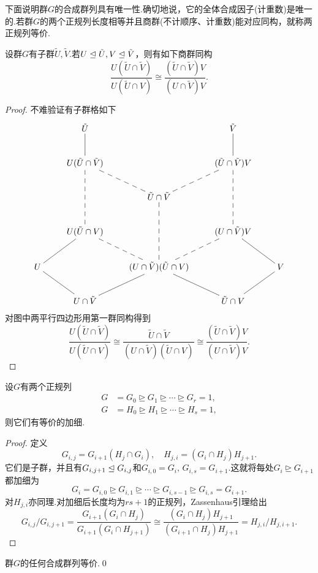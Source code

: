 下面说明群$G$的合成群列具有唯一性.确切地说，它的全体合成因子(计重数)是唯一的.若群$G$的两个正规列长度相等并且商群(不计顺序、计重数)能对应同构，就称两正规列{\heiti 等价}.

\begin{lemma*}[(Zassenhaus)]
	设群$G$有子群$\tilde{U},\tilde{V}$.若$U\trianglelefteq\tilde{U},V\trianglelefteq\tilde{V}$，则有如下商群同构
	\[
		\frac{U(\tilde{U}\cap\tilde{V})}{U(\tilde{U}\cap V)}\cong\frac{(\tilde{U}\cap\tilde{V})V}{(U\cap\tilde{V})V}.
	\]
\end{lemma*}
\begin{proof}
	不难验证有子群格如下
	\[
		\xymatrix{
			&\tilde{U}\ar@{-}[d]&&\tilde{V}\ar@{-}[d]&\\
			&U(\tilde{U}\cap\tilde{V})\ar@{--}[dd]\ar@{--}[rd]&&(\tilde{U}\cap\tilde{V})V\ar@{--}[dd]\ar@{--}[ld]&\\
			&&\tilde{U}\cap\tilde{V}\ar@{--}[dd]&&\\
			&U(\tilde{U}\cap V)\ar@{-}[ld]\ar@{--}[rd]&&(U\cap\tilde{V})V\ar@{--}[ld]\ar@{-}[rd]&\\
			U\ar@{-}[rd]&&(U\cap\tilde{V})(\tilde{U}\cap V)\ar@{-}[ld]\ar@{-}[rd]&&V\ar@{-}[ld]\\
			&U\cap\tilde{V}&&\tilde{U}\cap V&
		}
	\]
	对图中两平行四边形用第一群同构得到
	\begin{equation*}
		\frac{U(\tilde{U}\cap\tilde{V})}{U(\tilde{U}\cap V)}\cong\frac{\tilde{U}\cap\tilde{V}}{(U\cap\tilde{V})(\tilde{U}\cap V)}\cong\frac{(\tilde{U}\cap\tilde{V})V}{(U\cap\tilde{V})V}.
	\end{equation*}
\end{proof}
\begin{thm}[(Schreier加细)]
	设$G$有两个正规列
	\begin{align*}
		G & =G_0\trianglerighteq G_1\trianglerighteq\cdots\trianglerighteq G_r=1, \\
		G & =H_0\trianglerighteq H_1\trianglerighteq\cdots\trianglerighteq H_s=1,
	\end{align*}
	则它们有等价的加细.
\end{thm}
\begin{proof}
	定义
	\[
		G_{i,j}=G_{i+1}(H_j\cap G_i),\quad H_{j,i}=(G_i\cap H_j)H_{j+1}.
	\]
	它们是子群，并且有$G_{i,j+1}\trianglelefteq G_{i,j}$和$G_{i,0}=G_i,\,G_{i,s}=G_{i+1}$.这就将每处$G_i\trianglerighteq G_{i+1}$都加细为
	\[
		G_i=G_{i,0}\trianglerighteq G_{i,1}\trianglerighteq \cdots\trianglerighteq G_{i,s-1}\trianglerighteq G_{i,s}=G_{i+1}.
	\]
	对$H_{j,i}$亦同理.对加细后长度均为$rs+1$的正规列，Zassenhaus引理给出
	\begin{equation*}
		G_{i,j}/G_{i,j+1}=\frac{G_{i+1}(G_i\cap H_j)}{G_{i+1}(G_i\cap H_{j+1})}\cong\frac{(G_i\cap H_j)H_{j+1}}{(G_{i+1}\cap H_j)H_{j+1}}=H_{j,i}/H_{j,i+1}.
	\end{equation*}
\end{proof}
\begin{thm}
	群$G$的任何合成群列等价.\qed
\end{thm}

